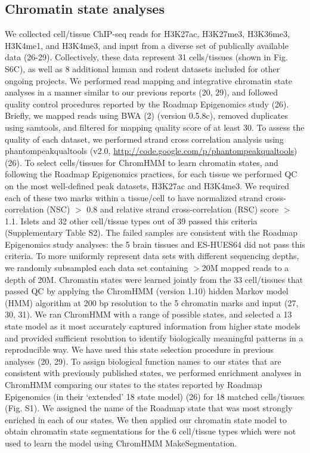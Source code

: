\subsection{Chromatin state analyses}
We collected cell/tissue ChIP-seq reads for H3K27ac, H3K27me3, H3K36me3, H3K4me1, and H3K4me3, and input from a diverse set of publically available data (26-29). Collectively, these data represent 31 cells/tissues (shown in Fig. S6C), as well as 8 additional human and rodent datasets included for other ongoing projects. We performed read mapping and integrative chromatin state analyses in a manner similar to our previous reports (20, 29), and followed quality control procedures reported by the Roadmap Epigenomics study (26). Briefly, we mapped reads using BWA (2) (version 0.5.8c), removed duplicates using samtools, and filtered for mapping quality score of at least 30. To assess the quality of each dataset, we performed strand cross correlation analysis using phantompeakqualtools  (v2.0, \url{http://code.google.com/p/phantompeakqualtools}) (26). To select cells/tissues for ChromHMM to learn chromatin states, and following the Roadmap Epigenomics practices, for each tissue we performed QC on the most well-defined peak datasets, H3K27ac and H3K4me3. We required each of these two marks within a tissue/cell to have normalized strand cross-correlation (NSC) $>$ 0.8 and relative strand cross-correlation (RSC) score $>$1.1. Islets and 32 other cell/tissue types out of 39 passed this criteria (Supplementary Table S2).  The failed samples are consistent with the Roadmap Epigenomics study analyses: the 5 brain tissues and ES-HUES64 did not pass this criteria. To more uniformly represent data sets with different sequencing depths, we randomly subsampled each data set containing $>$20M mapped reads to a depth of 20M. Chromatin states were learned jointly from the 33 cell/tissues that passed QC by applying the ChromHMM (version 1.10) hidden Markov model (HMM) algorithm at 200 bp resolution to the 5 chromatin marks and input (27, 30, 31). We ran ChromHMM with a range of possible states, and selected a 13 state model as it most accurately captured information from higher state models and provided sufficient resolution to identify biologically meaningful patterns in a reproducible way. We have used this state selection procedure in previous analyses (20, 29). To assign biological function names to our states that are consistent with previously published states, we performed enrichment analyses in ChromHMM comparing our states to the states reported by Roadmap Epigenomics (in their ‘extended’ 18 state model) (26) for 18 matched cells/tissues (Fig. S1). We assigned the name of the Roadmap state that was most strongly enriched in each of our states. We then applied our chromatin state model to obtain chromatin state segmentations for the 6 cell/tissue types which were not used to learn the model using ChromHMM MakeSegmentation. 

